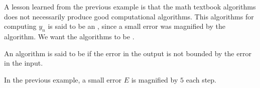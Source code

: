 A lesson learned from the previous example is that the math textbook algorithms does not necessarily produce good computational algorithms. This algorithms for computing \( y_n \) is said to be an , since a small error was magnified by the algorithm. We want the algorithms to be .

\begin{definition}
    An algorithm is said to be  if the error in the output is not bounded by the error in the input.
\end{definition}

\begin{remark}
    In the previous example, a small error \( E \) is magnified by \( 5 \) each step.
\end{remark}

